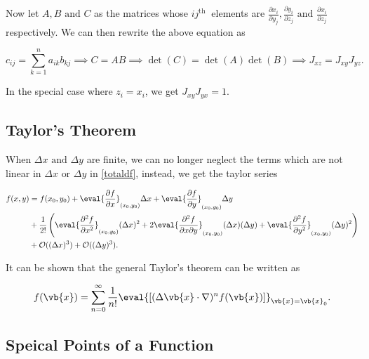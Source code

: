 \documentclass[english,a4paper,12pt]{report}
\begin{document}
Now let \(A, B \text { and } C\) as the matrices whose \(ij^{\text{th }} \) elements are \(\displaystyle \frac{\partial x_{i} }{\partial y_{j} }, \frac{\partial y_{i} }{\partial z_{j} } \text { and } \frac{\partial x_{i} }{\partial z_{j} }\) respectively. We can then rewrite the above equation as 

\begin{equation}
	c_{ij} = \sum_{k=1}^{n} a_{ik}b_{kj} \implies C = AB \implies \det (C) = \det (A) \det (B) \implies J_{xz} = J_{xy} J_{yz}.   
\end{equation}

In the special case where \(z_{i} = x_{i}  \), we get \(J_{xy}J_{yx} =1  \).  

\subsection{Taylor's Theorem}
When \(\Delta x \text { and }  \Delta y\) are finite, we can no longer neglect the terms which are not linear in \(\Delta x \text { or } \Delta y\) in \cref{totaldf}, instead, we get the taylor series 

\begin{equation}
    \begin{aligned}
    f(x,y) &= f(x_0 ,y_0 ) + \eval{\frac{\partial f}{\partial x}}_{(x_0 ,y_0 )}  \Delta x + \eval{\frac{\partial f}{\partial y}}_{(x_0 ,y_0 )} \Delta y \\ &+ \frac{1}{2!} \left( \eval{\frac{\partial^2 f}{\partial x^2}}_{(x_0 ,y_0 )}  (\Delta x)^2 + 2\eval{\frac{\partial^2 f}{\partial x \partial y}}_{(x_0 ,y_0 )}(\Delta x)(\Delta y) + \eval{\frac{\partial^2 f}{\partial y^2}}_{(x_0 ,y_0 )} (\Delta y)^2 \right) \\ &+ \mathcal{O}((\Delta x)^3 ) + \mathcal{O}((\Delta y)^3 ).        
    \end{aligned}
\end{equation}

It can be shown that the general Taylor's theorem can be written as 

\begin{equation}
    f(\vb{x} ) = \sum_{n=0}^{\infty} \frac{1}{n!} \eval{\left[ (\Delta \vb{x} \cdot \nabla )^{n} f(\vb{x} ) \right]}_{\vb{x} = \vb{x} _{0}}  .
\end{equation}

\subsection{Speical Points of a Function}
\end{document}
